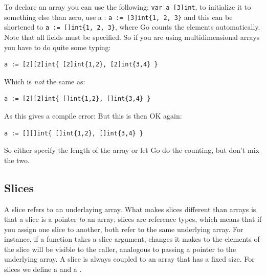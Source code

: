 To declare an array you can use the following: \lstinline{var a [3]int},
to initialize it to something else than zero, use a : \lstinline|a := [3]int{1, 2, 3}| and
this can be shortened to \lstinline|a := []int{1, 2, 3}|, where Go counts
the elements automatically. 
Note that all fields must be specified.  So if you are using multidimensional
arrays you have to do quite some typing:
\begin{lstlisting}
a := [2][2]int{ [2]int{1,2}, [2]int{3,4} }
\end{lstlisting}
Which is \emph{not} the same as:
\begin{lstlisting}
a := [2][2]int{ []int{1,2}, []int{3,4} }
\end{lstlisting}
As this gives a compile error:\newline
{}\newline
But this is then OK again:
\begin{lstlisting}
a := [][]int{ []int{1,2}, []int{3,4} }
\end{lstlisting}
So either specify the length of the array or let Go do the counting, but
don't mix the two.
\subsection{Slices}
A slice refers to an underlaying array. What makes slices different than
arrays is that a slice is a pointer \emph{to} an array;
slices are reference types, which means that if you assign one slice to
another, both refer to the same underlying array. For instance, if a
function takes a slice argument, changes it makes to the elements of the
slice will be visible to the caller, analogous to passing a pointer to
the underlying array. A slice is always coupled to an array that has
a fixed size. For slices we define a  and a
.


